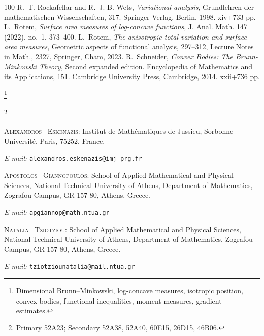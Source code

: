 \documentclass[11pt,leqno]{article}
\theoremstyle{definition}
\theoremstyle{remark}
\numberwithin{equation}{section}
\newcommand{\1}{\textbf{1}}
\begin{document}
\begin{thebibliography}{100}
 \textrm{R.~T. Rockafellar and R.~J.-B. Wets}, \textit{Variational analysis},  Grundlehren der mathematischen Wissenschaften, 317. Springer-Verlag, Berlin, 1998. xiv+733 pp. 
 \textrm{L.\ Rotem}, \textit{Surface area measures of log-concave functions}, J. Anal. Math. 147 (2022), no.~1, 373--400.
 \textrm{L.\ Rotem}, \textit{The anisotropic total variation and surface area measures}, Geometric aspects of functional analysis, 297--312, 
Lecture Notes in Math., 2327, Springer, Cham, 2023.
 \textrm{R.\ Schneider}, \textit{Convex Bodies: The Brunn-Minkowski Theory},
Second expanded edition. Encyclopedia of Mathematics and its Applications, 151.
Cambridge University Press, Cambridge, 2014. xxii+736 pp.
\end{thebibliography}


\bigskip


\thanks{ Dimensional Brunn–Minkowski, log-concave measures, isotropic position, convex bodies, functional inequalities, 
moment measures, gradient estimates.}

\smallskip

\thanks{ Primary 52A23; Secondary 52A38, 52A40, 60E15, 26D15, 46B06.}

\bigskip

\bigskip 

\medskip 

\noindent \textsc{Alexandros \ Eskenazis}: Institut de Math\'{e}matiques de Jussieu, Sorbonne Universit\'{e}, Paris, 75252, France.

\smallskip

\noindent \textit{E-mail:} \texttt{alexandros.eskenazis@imj-prg.fr}

\bigskip

\noindent \textsc{Apostolos \ Giannopoulos}: School of Applied Mathematical and Physical Sciences, National Technical University of Athens, Department of Mathematics, Zografou Campus, GR-157 80, Athens, Greece.


\smallskip

\noindent \textit{E-mail:} \texttt{apgiannop@math.ntua.gr}

\bigskip


\noindent \textsc{Natalia \ Tziotziou}: School of Applied Mathematical and Physical Sciences, National Technical University of Athens, Department of Mathematics, Zografou Campus, GR-157 80, Athens, Greece.


\smallskip

\noindent \textit{E-mail:} \texttt{tziotziounatalia@mail.ntua.gr}
\end{document}
